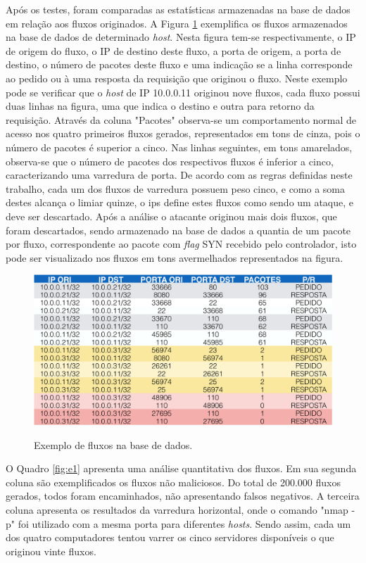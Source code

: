 Após os testes, foram comparadas as estatísticas armazenadas na base de dados em relação aos fluxos originados. A Figura \ref{fig:base} exemplifica os fluxos armazenados na base de dados de determinado \textit{host}. Nesta figura tem-se respectivamente, o IP de origem do fluxo, o IP de destino deste fluxo, a porta de origem, a porta de destino, o número de pacotes deste fluxo e uma indicação se a linha corresponde ao pedido ou à uma resposta da requisição que originou o fluxo.
Neste exemplo pode se verificar que o \textit{host} de IP 10.0.0.11 originou nove fluxos, cada fluxo possui duas linhas na figura, uma que indica o destino e outra para retorno da requisição. Através da coluna "Pacotes" observa-se um comportamento normal de acesso nos quatro primeiros fluxos gerados, representados em tons de cinza, pois o número de pacotes é superior a cinco. Nas linhas seguintes, em tons amarelados, observa-se que o número de pacotes dos respectivos fluxos é inferior a cinco, caracterizando uma varredura de porta. De acordo com as regras definidas neste trabalho, cada um dos fluxos de varredura possuem peso cinco, e como a soma destes alcança o limiar quinze, o \gls{ips} define estes fluxos como sendo um ataque, e deve ser descartado. Após a análise o atacante originou mais dois fluxos, que foram descartados, sendo armazenado na base de dados a quantia de um pacote por fluxo, correspondente ao pacote com \textit{flag} SYN recebido pelo controlador, isto pode ser visualizado nos fluxos em tons avermelhados representados na figura.


\begin{figure}[H]
  \centering
  \caption{Exemplo de fluxos na base de dados.}
  \includegraphics[width=.9\textwidth]{images/base.eps}
  \label{fig:base}
\end{figure}
\FloatBarrier

O Quadro \ref{fig:e1} apresenta uma análise quantitativa dos fluxos. Em sua segunda coluna são exemplificados os fluxos não maliciosos. Do total de 200.000 fluxos gerados, todos foram encaminhados, não apresentando falsos negativos. A terceira coluna apresenta os resultados da varredura horizontal, onde o comando "nmap -p" foi utilizado com a mesma porta para diferentes \textit{hosts}. Sendo assim, cada um dos quatro computadores tentou varrer os cinco servidores disponíveis o que originou vinte fluxos.

